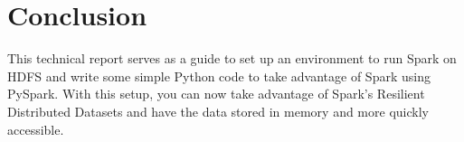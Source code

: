 \documentclass[9pt,twocolumn,twoside]{idsi}
\begin{document}
\section{Conclusion}

This technical report serves as a guide to set up an environment to run Spark on HDFS and write some simple Python code to take advantage of Spark using PySpark. With this setup, you can now take advantage of Spark's Resilient Distributed Datasets and have the data stored in memory and more quickly accessible.
\end{document}
